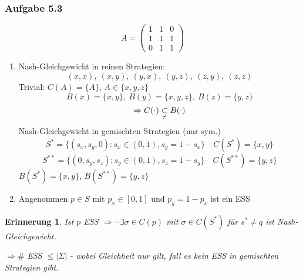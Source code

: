 \documentclass[12pt]{extreport} %
\theoremstyle{named}
\theoremstyle{itshape}
\theoremstyle{normal}
\newtheorem*{erinnerung}{Erinnerung}
\begin{document}
\subsubsection*{Aufgabe 5.3}
$$A = \begin{pmatrix} 1 & 1 & 0 \\ 1& 1 & 1 \\ 0 & 1 & 1 \end{pmatrix}$$   
\begin{enumerate}
	\item Nash-Gleichgewicht in reinen Strategien:
		$$ (x,x), ~(x,y), ~(y,x), ~(y,z), ~(z, y),  ~(z,z) $$
		Trivial: $C(A) = \{ A \}$, $A \in \{ x,y,z\}$
		$$ B(x) = \{x,y\}, ~B(y) = \{x, y,z\}, ~B(z) = \{ y, z \} $$
		$$ \Rightarrow C(\cdot) \underset{\not-}{\subset} B(\cdot) $$
		Nash-Gleichgewicht in gemischten Strategien (nur sym.)
		$$ S^{*} = \{ (s_x, s_y, 0) : s_x \in (0, 1), s_y = 1 - s_x \} \quad C(S^{*}) = \{x, y\} $$
		$$ S^{**} = \{ (0, s_y, s_z) : s_y \in (0, 1), s_z = 1 - s_y \} \quad C(S^{**}) = \{y, z\} $$
		$B(S^{*}) = \{ x, y \}$, $B(S^{**}) = \{y, z \}$
	\item Angenommen $p \in S$ mit $p_x \in [0, 1]$ und $p_y = 1 - p_x$ ist ein ESS
\end{enumerate}


\begin{erinnerung}
	Ist $p$ ESS $\Rightarrow \neg \exists \sigma \in C(p)$ mit $\sigma \in C(S^{*})$ für $s^{*} \neq q$ ist Nash-Gleichgewicht.

	$\Rightarrow \#$ ESS $\leq \left| \Sigma \right|$ - wobei Gleichheit nur gilt, fall es kein ESS in gemischten Strategien gibt.
\end{erinnerung}
   


\newpage


 \appendix {}  




\printindex
\end{document}
